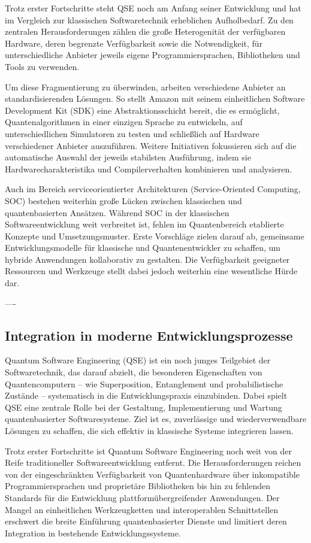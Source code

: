 Trotz erster Fortschritte steht QSE noch am Anfang seiner Entwicklung und hat im Vergleich zur klassischen Softwaretechnik erheblichen Aufholbedarf. Zu den zentralen Herausforderungen zählen die große Heterogenität der verfügbaren Hardware, deren begrenzte Verfügbarkeit sowie die Notwendigkeit, für unterschiedliche Anbieter jeweils eigene Programmiersprachen, Bibliotheken und Tools zu verwenden.

Um diese Fragmentierung zu überwinden, arbeiten verschiedene Anbieter an standardisierenden Lösungen. So stellt Amazon mit seinem einheitlichen Software Development Kit (SDK) eine Abstraktionsschicht bereit, die es ermöglicht, Quantenalgorithmen in einer einzigen Sprache zu entwickeln, auf unterschiedlichen Simulatoren zu testen und schließlich auf Hardware verschiedener Anbieter auszuführen. Weitere Initiativen fokussieren sich auf die automatische Auswahl der jeweils stabilsten Ausführung, indem sie Hardwarecharakteristika und Compilerverhalten kombinieren und analysieren.

Auch im Bereich serviceorientierter Architekturen (Service-Oriented Computing, SOC) bestehen weiterhin große Lücken zwischen klassischen und quantenbasierten Ansätzen. Während SOC in der klassischen Softwareentwicklung weit verbreitet ist, fehlen im Quantenbereich etablierte Konzepte und Umsetzungsmuster. Erste Vorschläge zielen darauf ab, gemeinsame Entwicklungsmodelle für klassische und Quantenentwickler zu schaffen, um hybride Anwendungen kollaborativ zu gestalten. Die Verfügbarkeit geeigneter Ressourcen und Werkzeuge stellt dabei jedoch weiterhin eine wesentliche Hürde dar.


----

\subsection{Integration in moderne Entwicklungsprozesse}

Quantum Software Engineering (QSE) ist ein noch junges Teilgebiet der Softwaretechnik, das darauf abzielt, die besonderen Eigenschaften von Quantencomputern – wie Superposition, Entanglement und probabilistische Zustände – systematisch in die Entwicklungspraxis einzubinden. Dabei spielt QSE eine zentrale Rolle bei der Gestaltung, Implementierung und Wartung quantenbasierter Softwaresysteme. Ziel ist es, zuverlässige und wiederverwendbare Lösungen zu schaffen, die sich effektiv in klassische Systeme integrieren lassen.

Trotz erster Fortschritte ist Quantum Software Engineering noch weit von der Reife traditioneller Softwareentwicklung entfernt. Die Herausforderungen reichen von der eingeschränkten Verfügbarkeit von Quantenhardware über inkompatible Programmiersprachen und proprietäre Bibliotheken bis hin zu fehlenden Standards für die Entwicklung plattformübergreifender Anwendungen. Der Mangel an einheitlichen Werkzeugketten und interoperablen Schnittstellen erschwert die breite Einführung quantenbasierter Dienste und limitiert deren Integration in bestehende Entwicklungssysteme.

